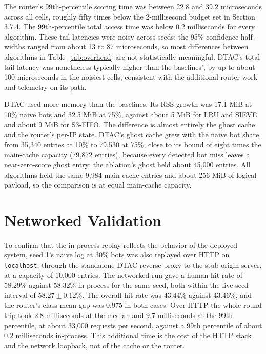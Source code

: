 The router's 99th-percentile scoring time was between 22.8 and 39.2 microseconds across all cells, roughly fifty times below the 2-millisecond budget set in Section 3.7.4. The 99th-percentile total access time was below 0.2 milliseconds for every algorithm. These tail latencies were noisy across seeds: the 95\% confidence half-widths ranged from about 13 to 87 microseconds, so most differences between algorithms in Table~\ref{tab:overhead} are not statistically meaningful. DTAC's total tail latency was nonetheless typically higher than the baselines', by up to about 100 microseconds in the noisiest cells, consistent with the additional router work and telemetry on its path.

DTAC used more memory than the baselines. Its RSS growth was 17.1 MiB at 10\% naive bots and 32.5 MiB at 75\%, against about 5 MiB for LRU and SIEVE and about 9 MiB for S3-FIFO. The difference is almost entirely the ghost cache and the router's per-IP state. DTAC's ghost cache grew with the naive bot share, from 35{,}340 entries at 10\% to 79{,}530 at 75\%, close to its bound of eight times the main-cache capacity (79{,}872 entries), because every detected bot miss leaves a near-zero-score ghost entry; the ablation's ghost held about 45{,}000 entries. All algorithms held the same 9{,}984 main-cache entries and about 256 MiB of logical payload, so the comparison is at equal main-cache capacity.

\section{Networked Validation}
To confirm that the in-process replay reflects the behavior of the deployed system, seed 1's naive log at 30\% bots was also replayed over HTTP on \texttt{localhost}, through the standalone DTAC reverse proxy to the stub origin server, at a capacity of 10{,}000 entries. The networked run gave a human hit rate of 58.29\% against 58.32\% in-process for the same seed, both within the five-seed interval of $58.27 \pm 0.12\%$. The overall hit rate was 43.44\% against 43.46\%, and the router's class-mean gap was 0.975 in both cases. Over HTTP the whole round trip took 2.8 milliseconds at the median and 9.7 milliseconds at the 99th percentile, at about 33{,}000 requests per second, against a 99th percentile of about 0.2 milliseconds in-process. This additional time is the cost of the HTTP stack and the network loopback, not of the cache or the router.

